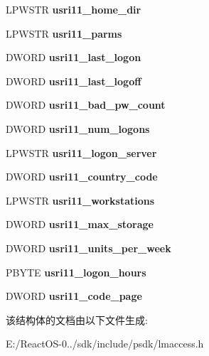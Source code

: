\begin{DoxyCompactItemize}
L\+P\+W\+S\+TR {\bfseries usri11\+\_\+home\+\_\+dir}
\item 
\mbox{\label{struct___u_s_e_r___i_n_f_o__11_a4b1443f2638b0df968376476c9e6e07d}} 
L\+P\+W\+S\+TR {\bfseries usri11\+\_\+parms}
\item 
\mbox{\label{struct___u_s_e_r___i_n_f_o__11_abf5b5ec30f3803bb632bbcd3565c7579}} 
D\+W\+O\+RD {\bfseries usri11\+\_\+last\+\_\+logon}
\item 
\mbox{\label{struct___u_s_e_r___i_n_f_o__11_a89f7ccff1b72bdc8035ee4f8917c5d95}} 
D\+W\+O\+RD {\bfseries usri11\+\_\+last\+\_\+logoff}
\item 
\mbox{\label{struct___u_s_e_r___i_n_f_o__11_a718eb0f04ee374fca811198eebd312dd}} 
D\+W\+O\+RD {\bfseries usri11\+\_\+bad\+\_\+pw\+\_\+count}
\item 
\mbox{\label{struct___u_s_e_r___i_n_f_o__11_a999df6e08c83186d2d737e37baa8c49a}} 
D\+W\+O\+RD {\bfseries usri11\+\_\+num\+\_\+logons}
\item 
\mbox{\label{struct___u_s_e_r___i_n_f_o__11_ab14aa2b989affa3fde60aef11532457e}} 
L\+P\+W\+S\+TR {\bfseries usri11\+\_\+logon\+\_\+server}
\item 
\mbox{\label{struct___u_s_e_r___i_n_f_o__11_af778dd87ea616b17d4db3cb9a1e302fd}} 
D\+W\+O\+RD {\bfseries usri11\+\_\+country\+\_\+code}
\item 
\mbox{\label{struct___u_s_e_r___i_n_f_o__11_ada412fa503265829512df2d24096438c}} 
L\+P\+W\+S\+TR {\bfseries usri11\+\_\+workstations}
\item 
\mbox{\label{struct___u_s_e_r___i_n_f_o__11_aa785bc18d90bd0669bd6c35752765e92}} 
D\+W\+O\+RD {\bfseries usri11\+\_\+max\+\_\+storage}
\item 
\mbox{\label{struct___u_s_e_r___i_n_f_o__11_a9599e6aa6bdd0289d506656cc8a92b72}} 
D\+W\+O\+RD {\bfseries usri11\+\_\+units\+\_\+per\+\_\+week}
\item 
\mbox{\label{struct___u_s_e_r___i_n_f_o__11_a3dc038ee722ccafbb1367ead0db2786c}} 
P\+B\+Y\+TE {\bfseries usri11\+\_\+logon\+\_\+hours}
\item 
\mbox{\label{struct___u_s_e_r___i_n_f_o__11_a4017d3a88ceecc402e1a4eb277f772c5}} 
D\+W\+O\+RD {\bfseries usri11\+\_\+code\+\_\+page}
\end{DoxyCompactItemize}


该结构体的文档由以下文件生成\+:\begin{DoxyCompactItemize}
\item 
E\+:/\+React\+O\+S-\/0../sdk/include/psdk/lmaccess.\+h\end{DoxyCompactItemize}
